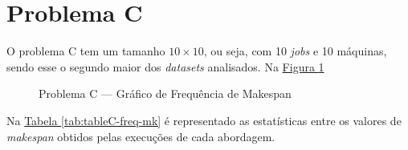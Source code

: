 \section{Problema C}
O problema C tem um tamanho $10 \times 10$, ou seja, com 10 \textit{jobs} e 10 máquinas, 
sendo esse o segundo maior dos \textit{datasets} analisados.
Na \hyperref[fig:plobC-freq-mk]{Figura \ref{fig:plobC-freq-mk}} 
\begin{figure}[!htb]
    \caption{Problema C — Gráfico de Frequência de Makespan}
    \label{fig:plobC-freq-mk}
    \begin{minipage}{.5\linewidth}
        \centering
        \subfloat[]{
            \label{plobC-freq-mk:a}
            \resizebox{\linewidth}{!}{}
        }
    \end{minipage}%
    \begin{minipage}{.5\linewidth}
        \centering
        \subfloat[]{
            \label{plobC-freq-mk:b}
            \resizebox{\linewidth}{!}{}
        }
    \end{minipage}\par\medskip
      \centering
      \subfloat[]{
        \label{plobC-freq-mk:c}
        \resizebox{.5\linewidth}{!}{}
      }
\end{figure}
Na
\hyperref[tab:tableC-freq-mk]{Tabela \ref{tab:tableC-freq-mk}}
é representado as estatísticas entre os valores de \textit{makespan} obtidos pelas execuções de cada abordagem.
